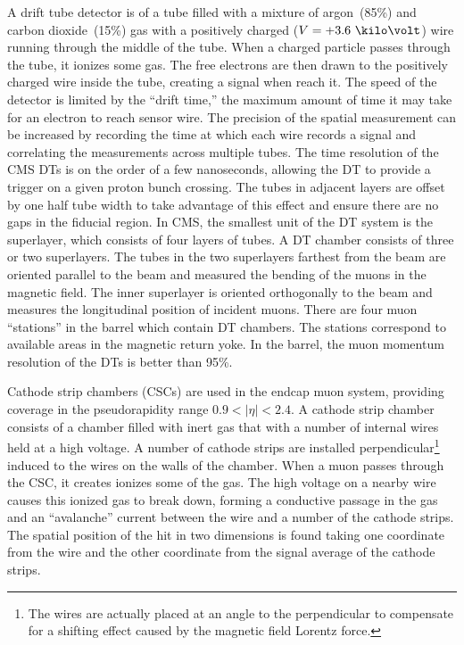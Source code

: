 A drift tube detector is of a tube filled with a mixture of argon~(85\%) and
carbon dioxide~(15\%) gas with a positively charged ($V = +3.6~\kilo\volt$) wire
running through the middle of the tube.  When a charged particle passes through
the tube, it ionizes some gas.  The free electrons are then drawn to the
positively charged wire inside the tube, creating a signal when reach it. The
speed of the detector is limited by the ``drift time,'' the maximum amount of
time it may take for an electron to reach sensor wire.   The precision of the
spatial measurement can be increased by recording the time at which each wire
records a signal and correlating the measurements across multiple tubes. The
time resolution of the CMS DTs is on the order of a few nanoseconds, allowing
the DT to provide a trigger on a given proton bunch crossing.  The tubes in
adjacent layers are offset by one half tube width to take advantage of this
effect and ensure there are no gaps in the fiducial region.  In CMS, the
smallest unit of the DT system is the superlayer, which consists of four layers
of tubes.  A DT chamber consists of three or two superlayers.  The tubes in the
two superlayers farthest from the beam are oriented parallel to the beam and
measured the bending of the muons in the magnetic field.  The inner superlayer
is oriented orthogonally to the beam and measures the longitudinal position of
incident muons.  There are four muon ``stations'' in the barrel which contain DT
chambers.  The stations correspond to available areas in the magnetic return
yoke.  In the barrel, the muon momentum resolution of the DTs is better than
95\%.

Cathode strip chambers (CSCs) are used in the endcap muon system, providing
coverage in the pseudorapidity range $0.9 < |\eta| < 2.4$.  A cathode strip
chamber consists of a chamber filled with inert gas that with a number of
internal wires held at a high voltage.   A number of cathode strips are
installed perpendicular\footnote{The wires are actually placed at an angle to
the perpendicular to compensate for a shifting effect caused by the magnetic
field Lorentz force.} induced to the wires on the walls of the chamber.  When a
muon passes through the CSC, it creates ionizes some of the gas.  The high
voltage on a nearby wire causes this ionized gas to break down, forming a
conductive passage in the gas and an ``avalanche'' current between the wire and
a number of the cathode strips.  The spatial position of the hit in two
dimensions is found taking one coordinate from the wire and the other coordinate
from the signal average of the cathode strips.

